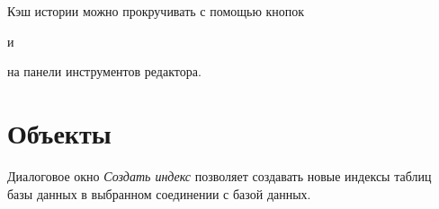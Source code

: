 Кэш истории можно прокручивать с помощью кнопок 
и 
 на панели инструментов редактора. 

\newpage


\section{Объекты}\label{sec:objects}

\label{sec:crind}

Диалоговое окно \textit{Создать индекс} позволяет создавать новые индексы таблиц базы данных в выбранном соединении с базой данных.

